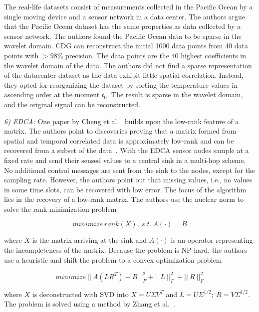 The real-life datasets consist of measurements collected in the Pacific Ocean
by a single moving device and a sensor network in a data center. The authors
argue that the Pacific Ocean dataset has the same properties as data collected
by a sensor network. The authors found the Pacific Ocean data to be sparse in
the wavelet domain. \ac{CDG} can reconstruct the initial 1000 data points from
40 data points with $ > 98\% $ precision. The data points are the 40 highest
coefficients in the wavelet domain of the data. The authors did not find a
sparse representation of the datacenter dataset as the data exhibit little
spatial correlation. Instead, they opted for reorganizing the dataset by
sorting the temperature values in ascending order at the moment $ t_0 $. The
result is sparse in the wavelet domain, and the original signal can be
reconstructed.
\par
\textit{6) \ac{EDCA}:}
One paper by Cheng et al.~\cite{cheng2010efficient} builds upon the low-rank
feature of a matrix. The authors point to discoveries proving that a matrix
formed from spatial and temporal correlated data is approximately low-rank and
can be recovered from a subset of the data~\cite{vuran2004spatio,
candes2009exact}. With the \ac{EDCA} sensor nodes sample at a fixed rate and
send their sensed values to a central sink in a multi-hop scheme. No additional
control messages are sent from the sink to the nodes, except for the
sampling rate. However, the authors point out that missing values, i.e., no
values in some time slots, can be recovered with low error. The focus of the
algorithm lies in the recovery of a low-rank matrix. The authors use the
nuclear norm to solve the rank minimization problem

$$
minimize \ rank(X), \ s.t. \ A(\cdot)=B
$$

where $ X $ is the matrix arriving at the sink and $ A(\cdot) $ is an operator
representing the incompleteness of the matrix. Because the problem is NP-hard,
the authors use a heuristic and shift the problem to a convex optimization
problem

$$
minimize \ || \ A(LR^T) - B \ ||^2_F + || \ L \ ||^2_F \ + || \ R \ ||^2_F
$$

where $ X $ is deconstructed with \ac{SVD} into $ X = U \Sigma V^T $ and $ L =
U\Sigma^{1/2}; \ R = V\Sigma^{1/2}$. The problem is solved using a method by
Zhang et al.~\cite{zhang2009spatio}.

